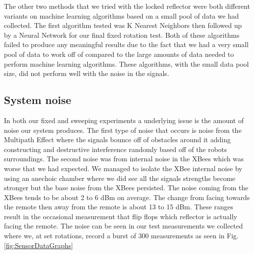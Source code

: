 \vspace*{12pt}
\noindent
The other two methods that we tried with the locked reflector were both different variants on machine learning algorithms based on a small pool of data we had collected. The first algorithm tested was K Nearest Neighbors then followed up by a Neural Network for our final fixed rotation test. Both of these algorithms failed to produce any meaningful results due to the fact that we had a very small pool of data to work off of compared to the large amounts of data needed to perform machine learning algorithms. These algorithms, with the small data pool size, did not perform well with the noise in the signals.

\subsection{System noise}

In both our fixed and sweeping experiments a underlying issue is the amount of noise our system produces. The first type of noise that occurs is noise from the Multipath Effect where the signals bounce off of obstacles around it adding constructing and destructive interference randomly based off of the robots surroundings. The second noise was from internal noise in the XBees which was worse that we had expected. We managed to isolate the XBee internal noise by using an anechoic chamber where we did see all the signals strengths become stronger but the base noise from the XBees persisted. The noise coming from the XBees tends to be about 2 to 6 dBm on average. The change from facing towards the remote then away from the remote is about 13 to 15 dBm. These ranges result in the occasional measurement that flip flops which reflector is actually facing the remote. The noise can be seen in our test measurements we collected where we, at set rotations, record a burst of 300 measurements as seen in Fig. \ref{fig:SensorDataGraphs}

